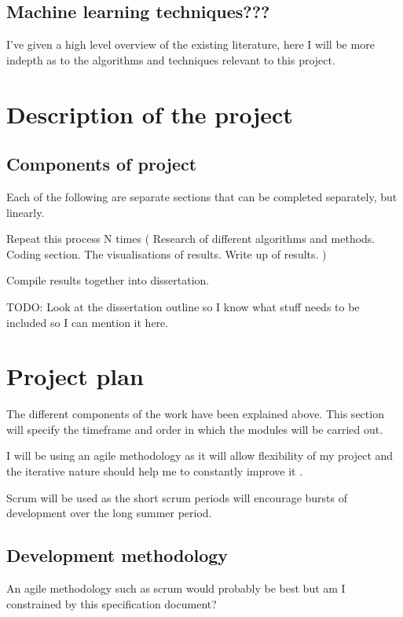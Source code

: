 \documentclass{article}
\begin{document}
\subsection{Machine learning techniques???}
I've given a high level overview of the existing literature, here I will be more indepth as to the algorithms and techniques relevant to this project.




\section{Description of the project}

\subsection{Components of project}
Each of the following are separate sections that can be completed separately, but linearly.

Repeat this process N times
(
Research of different algorithms and methods.
Coding section.
The visualisations of results.
Write up of results.
)

Compile results together into dissertation.

TODO: Look at the dissertation outline so I know what stuff needs to be included so I can mention it here.

\section{Project plan}
% 

The different components of the work have been explained above.
This section will specify the timeframe and order in which the modules will be carried out.

I will be using an agile methodology as it will allow flexibility of my project and the iterative nature should help me to constantly improve it \cite{beck2001manifesto}. 

Scrum will be used as the short scrum periods will encourage bursts of development over the long summer period.

\subsection{Development methodology}
An agile methodology such as scrum would probably be best but am I constrained  by this specification document?
\end{document}
